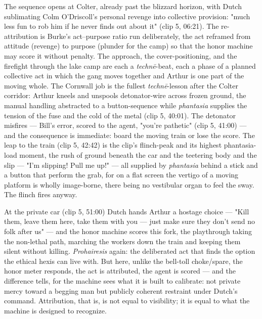 \documentclass{article}
\begin{document}
The sequence opens at Colter, already past the blizzard horizon, with Dutch sublimating Colm O'Driscoll's personal revenge into collective provision: "much less fun to rob him if he never finds out about it" (clip 5, 06:21). The re-attribution is Burke's act–purpose ratio run deliberately, the act reframed from attitude (revenge) to purpose (plunder for the camp) so that the honor machine may score it without penalty. The approach, the cover-positioning, and the firefight through the lake camp are each a \textit{technē}-beat, each a phase of a planned collective act in which the gang moves together and Arthur is one part of the moving whole. The Cornwall job is the fullest \textit{technē}-lesson after the Colter corridor: Arthur kneels and unspools detonator-wire across frozen ground, the manual handling abstracted to a button-sequence while \textit{phantasia} supplies the tension of the fuse and the cold of the metal (clip 5, 40:01). The detonator misfires — Bill's error, scored to the agent, "you're pathetic" (clip 5, 41:00) — and the consequence is immediate: board the moving train or lose the score. The leap to the train (clip 5, 42:42) is the clip's flinch-peak and its highest phantasia-load moment, the rush of ground beneath the car and the teetering body and the slip — "I'm slipping! Pull me up!" — all supplied by \textit{phantasia} behind a stick and a button that perform the grab, for on a flat screen the vertigo of a moving platform is wholly image-borne, there being no vestibular organ to feel the sway. The flinch fires anyway.

At the private car (clip 5, 51:00) Dutch hands Arthur a hostage choice — "Kill them, leave them here, take them with you — just make sure they don't send no folk after us" — and the honor machine scores this fork, the playthrough taking the non-lethal path, marching the workers down the train and keeping them silent without killing. \textit{Prohairesis} again: the deliberated act that finds the option the ethical hexis can live with. But here, unlike the bell-toll choke/spare, the honor meter responds, the act is attributed, the agent is scored — and the difference tells, for the machine sees what it is built to calibrate: not private mercy toward a begging man but publicly coherent restraint under Dutch's command. Attribution, that is, is not equal to visibility; it is equal to what the machine is designed to recognize.
\end{document}
